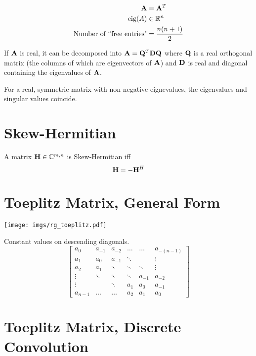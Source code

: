 \begin{align}
\mathbf{A}                                &=   \mathbf{A}^T \\
\operatorname{eig}(A)                            &\in \mathbb{R}^{n}  \\
\textrm{Number of ``free entries"} &=    \frac{n(n+1)}{2}
\end{align}

If $\mathbf{A}$ is real, it can be decomposed into $\mathbf{A}=\mathbf{Q}^T\mathbf{D}\mathbf{Q}$ where $\mathbf{Q}$ is a real orthogonal matrix (the columns of which are eigenvectors of $\mathbf{A}$) and $\mathbf{D}$ is real and diagonal containing the eigenvalues of $\mathbf{A}$.

For a real, symmetric matrix with non-negative eignevalues, the eigenvalues and singular values coincide.



\section{Skew-Hermitian}
A matrix $\mathbf{H}\in\mathbb{C}^{m,n}$ is Skew-Hermitian iff
\begin{equation}
\mathbf{H}=-\mathbf{H}^H
\end{equation}



\section{Toeplitz Matrix, General Form}

\begin{center}
\texttt{[image: imgs/rg\_toeplitz.pdf]}
\end{center}
Constant values on descending diagonals.
\begin{equation}
\begin{bmatrix}
  a_{0} & a_{-1} & a_{-2} & \ldots  & \ldots & a_{-(n-1)}  \\
  a_{1} & a_0    & a_{-1} & \ddots  &        & \vdots \\
  a_{2} & a_{1}  & \ddots & \ddots  & \ddots & \vdots \\
 \vdots & \ddots & \ddots & \ddots  & a_{-1} & a_{-2}\\
 \vdots &        & \ddots & a_{1}   & a_{0}  & a_{-1} \\
a_{n-1} & \ldots & \ldots & a_{2}   & a_{1}  & a_{0}
\end{bmatrix}
\end{equation}


\section{Toeplitz Matrix, Discrete Convolution}

